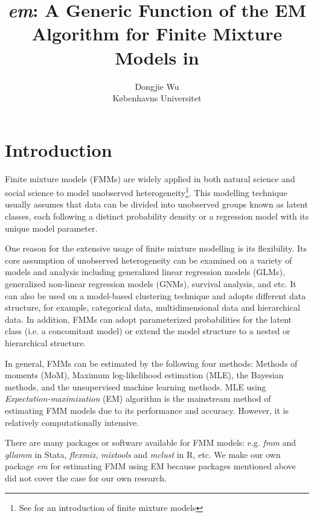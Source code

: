 \documentclass[nojss]{jss}
\title{\emph{em}: A Generic Function of the EM Algorithm for Finite Mixture Models in \proglang{R}}
\author{Dongjie Wu\\Københavns Universitet}
\begin{document}
   \section{Introduction}
Finite mixture models (FMMs) are widely applied in both natural science and social science to model unobserved heterogeneity\footnote{See \citet{mclachlan2019finite} for an introduction of finite mixture models}. This modelling technique usually assumes that data can be divided into unobserved groups known as latent classes, each following a distinct probability density or a regression model with its unique model parameter. 

One reason for the extensive usage of finite mixture modelling is its flexibility. Its core assumption of unobserved heterogeneity can be examined on a variety of models and analysis including generalized linear regression models (GLMs), generalized non-linear regression models (GNMs), survival analysis, and etc. It can also be used on a model-based clustering technique and adopts different data structure, for example, categorical data, multidimensional data and hierarchical data\citep{vermunt2008latent}. In addition, FMMs can adopt parameterized probabilities for the latent class (i.e. a concomitant model\citep{wedel2002concomitant}) or extend the model structure to a nested or hierarchical structure\citep{vermunt2005hierarchical}.

In general, FMMs can be estimated by the following four methods: Methods of moments (MoM), Maximum log-likelihood estimation (MLE), the Bayesian methods, and the unsupervised machine learning methods. MLE using \emph{Expectation-maximization} (EM) algorithm is the mainstream method of estimating FMM models due to its performance and accuracy. However, it is relatively computationally intensive. 

There are many packages or software available for FMM models: e.g.  \emph{fmm}\citep{deb2007} and \emph{gllamm}\citep{rabe2004gllamm} in Stata, \emph{flexmix}\citep{leisch2004flexmix}, \emph{mixtools}\citep{benaglia2010mixtools} and \emph{mclust}\citep{scrucca2016mclust} in R, etc.
We make our own package \emph{em} for estimating FMM using EM because packages mentioned above did not cover the case for our own research.
\end{document}
